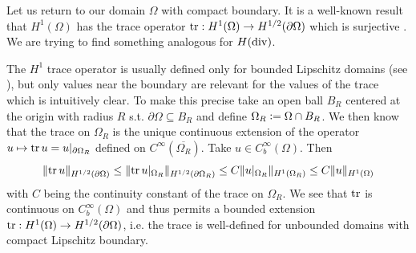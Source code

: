 \documentclass[../master_thesis.tex]{subfiles}
\begin{document}
Let us return to our domain $\Omega$ with compact boundary. It 
is a well-known result that $H^1(\Omega)$ has the trace operator 
$\operatorname{tr}: H^1(\Omega) \rightarrow H^{1/2}(\partial \Omega)$ which is surjective \cite[p.28]{arnold}.
We are trying to find something analogous for $H(\operatorname{div})$.

\begin{remark}
    The $H^1$ trace operator is usually defined only for bounded Lipschitz domains 
    (see \cite[Thm.\,3.9]{monk}), but only values near the boundary are relevant for the 
    values of the trace which is intuitively clear. 
    To make this precise take an open ball $B_R$ centered at the origin with radius $R$ 
    s.t. $\partial \Omega \subseteq B_R$ and define $\Omega_R \vcentcolon= \Omega \cap B_R$.
    We then know that the trace on $\Omega_R$ is the 
    unique continuous extension of the operator $u \mapsto \operatorname{tr} u = u|_{\partial \Omega_R}$ 
    defined on $C^\infty(\overline{\Omega_R})$. Take 
    $u \in C^\infty_b(\Omega)$. Then 
    \begin{align*}
        \lVert \operatorname{tr} u \rVert _{H^{1/2}(\partial \Omega)} 
        \leq \lVert \operatorname{tr} u|_{\Omega_R} \rVert _{H^{1/2}(\partial \Omega_R)}
        \leq C \lVert u|_{\Omega_R} \rVert _{H^1(\Omega_R)}
        \leq C \lVert u \rVert _{H^1(\Omega)}
    \end{align*}
    with $C$ being the continuity constant of the trace on $\Omega_R$. 
    We see that $\operatorname{tr}$ is continuous on $C^\infty_b (\Omega)$ and thus permits 
    a bounded extension $\operatorname{tr}: H^1(\Omega) \rightarrow H^{1/2}(\partial \Omega)$,
    i.e. the trace is well-defined for unbounded domains with compact Lipschitz boundary.

\end{remark}
\end{document}
